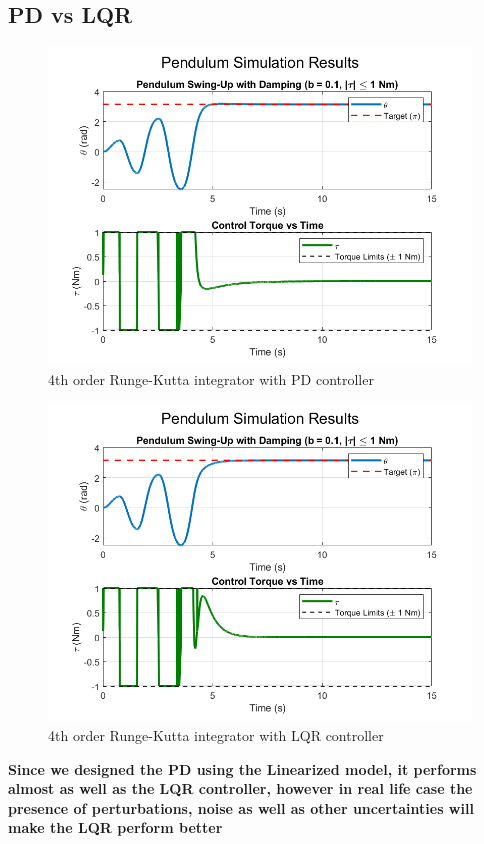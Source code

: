 \documentclass[12pt,a4paper]{article}
\begin{document}
\subsection{PD vs LQR}
\begin{figure}[htbp]
  \centering
  \includegraphics[width=0.9\linewidth]{../figs/rk_pd_swing_up.png}
  \caption{4th order Runge-Kutta integrator with PD controller}
  \label{fig:rk_pd_swing_up}
\end{figure}


\begin{figure}[htbp]
  \centering
  \includegraphics[width=0.9\linewidth]{../figs/lqr_rk_pd_swing_up.png}
  \caption{4th order Runge-Kutta integrator with LQR controller}
  \label{fig:lqr_rk_pd_swing_up}
\end{figure}

\textbf{Since we designed the PD using the Linearized model, it performs almost as well as the LQR controller, however in real life case the presence of perturbations, noise as well as other uncertainties will make the LQR perform better}

\newpage

\tableofcontents
\listoffigures
\end{document}
